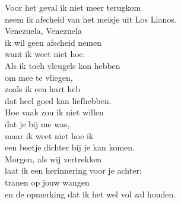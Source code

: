 \begin{translation}
Voor het geval ik niet meer terugkom\\
neem ik afscheid van het meisje uit Los Llanos.\\
Venezuela, Venezuela\\
ik wil geen afscheid nemen\\
want ik weet niet hoe.\\\vspace{1em}
Als ik toch vleugels kon hebben\\
om mee te vliegen,\\
zoals ik een hart heb\\
dat heel goed kan liefhebben.\\\vspace{1em}
Hoe vaak zou ik niet willen\\
dat je bij me was,\\
maar ik weet niet hoe ik\\
een beetje dichter bij je kan komen.\\\vspace{1em}
Morgen, als wij vertrekken\\
laat ik een herinnering voor je achter:\\
tranen op jouw wangen\\
en de opmerking dat ik het wel vol zal houden. \\
\end{translation}
